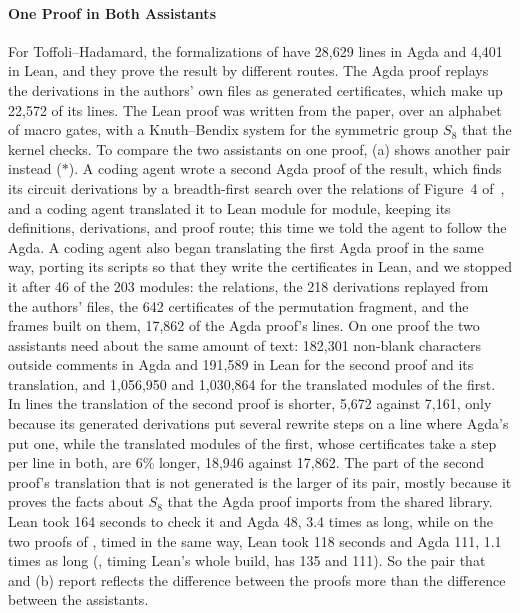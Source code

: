 \documentclass[acmsmall,screen,nonacm]{acmart}
\begin{document}
\paragraph{One Proof in Both Assistants} For Toffoli--Hadamard, the formalizations of  have 28{,}629 lines in Agda and 4{,}401 in Lean, and they prove the result by different routes. The Agda proof replays the derivations in the authors' own files as generated certificates, which make up 22{,}572 of its lines. The Lean proof was written from the paper, over an alphabet of macro gates, with a Knuth--Bendix system for the symmetric group $S_8$ that the kernel checks. To compare the two assistants on one proof, (a) shows another pair instead ($\ast$). A coding agent wrote a second Agda proof of the result, which finds its circuit derivations by a breadth-first search over the relations of Figure~4 of~\cite{amy2024toffoli}, and a coding agent translated it to Lean module for module, keeping its definitions, derivations, and proof route; this time we told the agent to follow the Agda. A coding agent also began translating the first Agda proof in the same way, porting its scripts so that they write the certificates in Lean, and we stopped it after 46 of the 203 modules: the relations, the 218 derivations replayed from the authors' files, the 642 certificates of the permutation fragment, and the frames built on them, 17{,}862 of the Agda proof's lines. On one proof the two assistants need about the same amount of text: 182{,}301 non-blank characters outside comments in Agda and 191{,}589 in Lean for the second proof and its translation, and 1{,}056{,}950 and 1{,}030{,}864 for the translated modules of the first. In lines the translation of the second proof is shorter, 5{,}672 against 7{,}161, only because its generated derivations put several rewrite steps on a line where Agda's put one, while the translated modules of the first, whose certificates take a step per line in both, are 6\% longer, 18{,}946 against 17{,}862. The part of the second proof's translation that is not generated is the larger of its pair, mostly because it proves the facts about $S_8$ that the Agda proof imports from the shared library. Lean took 164 seconds to check it and Agda 48, 3.4 times as long, while on the two proofs of , timed in the same way, Lean took 118 seconds and Agda 111, 1.1 times as long (, timing Lean's whole build, has 135 and 111). So the pair that  and (b) report reflects the difference between the proofs more than the difference between the assistants.
\end{document}
